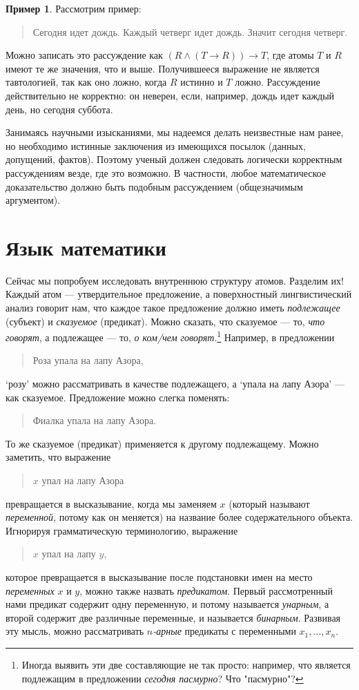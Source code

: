 \documentclass[12pt,notitlepage]{article}
\theoremstyle{plain}
\theoremstyle{definition}
\newtheorem{exm}[thm]{Пример}
\theoremstyle{plain}
\newcommand{\1}{\mathbf{1}}
\newcommand{\0}{\mathbf{0}}
\newcommand{\mcomm}[1]{}
\begin{document}
\begin{exm}
	Рассмотрим пример:
	\begin{quote}
		Сегодня идет дождь. Каждый четверг идет дождь. Значит сегодня четверг.
	\end{quote}
	Можно записать это рассуждение как $(R \wedge (T \to R)) \to T$, где атомы $T$ и $R$ имеют те же значения, что и выше. Получившееся выражение не является тавтологией, так как оно ложно, когда $R$ истинно и $T$ ложно. Рассуждение действительно не корректно: он неверен, если, например, дождь идет каждый день, но сегодня суббота.
\end{exm}

Занимаясь научными изысканиями, мы надеемся делать неизвестные нам ранее, но необходимо истинные заключения из имеющихся посылок (данных, допущений, фактов). Поэтому ученый должен следовать логически корректным рассуждениям везде, где это возможно. В частности, любое математическое доказательство должно быть подобным рассуждением (общезначимым аргументом).

\section{Язык математики}
\mcomm{}

Сейчас мы попробуем исследовать внутреннюю структуру атомов. Разделим их! Каждый атом --- утвердительное предложение, а поверхностный лингвистический анализ говорит нам, что каждое такое предложение должно иметь \emph{подлежащее} (субъект) и \emph{сказуемое} (предикат). Можно сказать, что сказуемое --- то, \emph{что говорят}, а подлежащее --- то, \emph{о ком/чем говорят}.\footnote{Иногда выявить эти две составляющие не так просто: например, что является подлежащим в предложении \emph{сегодня пасмурно}? Что "пасмурно"?} Например, в предложении
\begin{quote}
	Роза упала на лапу Азора,
\end{quote}
`розу' можно рассматривать в качестве подлежащего, а `упала на лапу Азора' --- как сказуемое. Предложение можно слегка поменять:
\begin{quote}
	Фиалка упала на лапу Азора.
\end{quote}
То же сказуемое (предикат) применяется к другому подлежащему. Можно заметить, что выражение
\begin{quote}
	$x$ упал на лапу Азора
\end{quote}
превращается в высказывание, когда мы заменяем $x$ (который называют \emph{переменной}, потому как он меняется) на название более содержательного объекта. Игнорируя грамматическую терминологию, выражение
\begin{quote}
	$x$ упал на лапу $y$,
\end{quote}
которое превращается в высказывание после подстановки имен на место \emph{переменных} $x$ и $y$, можно также назвать \emph{предикатом}. Первый рассмотренный нами предикат содержит одну переменную, и потому называется \emph{унарным}, а второй содержит две различные переменные, и называется \emph{бинарным}. Развивая эту мысль, можно рассматривать \emph{$n$-арные} предикаты с переменными $x_1,\ldots,x_n$.
\end{document}
